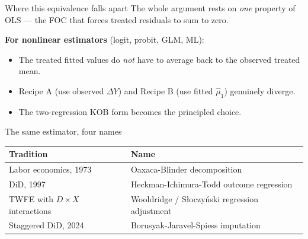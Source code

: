 \documentclass[aspectratio=169,11pt]{beamer}
\begin{document}
\begin{frame}{Where this equivalence falls apart}
\footnotesize
The whole argument rests on \textit{one} property of OLS --- the FOC that forces treated residuals to sum to zero.

\vspace{0.6em}
\textbf{For nonlinear estimators} (logit, probit, GLM, ML):
\begin{itemize}\setlength\itemsep{1pt}\footnotesize
  \item The treated fitted values do \textit{not} have to average back to the observed treated mean.
  \item Recipe A (use observed $\Delta Y$) and Recipe B (use fitted $\widehat\mu_1$) genuinely diverge.
  \item The two-regression KOB form becomes the principled choice.
\end{itemize}

\vspace{0.6em}
\end{frame}

\begin{frame}{The same estimator, four names}
\vspace{0.4em}
\footnotesize
\begin{center}
\renewcommand{\arraystretch}{1.4}
\begin{tabular}{@{}ll@{}}
\toprule
\textbf{Tradition} & \textbf{Name} \\
\midrule
Labor economics, 1973            & Oaxaca-Blinder decomposition \\
DiD, 1997                        & Heckman-Ichimura-Todd outcome regression \\
TWFE with $D{\times}X$ interactions & Wooldridge / Słoczyński regression adjustment \\
Staggered DiD, 2024              & Borusyak-Jaravel-Spiess imputation \\
\bottomrule
\end{tabular}
\end{center}

\vspace{0.7em}
\begin{center}
\Large
{}
\end{center}

\vspace{0.5em}
\end{frame}
\end{document}
